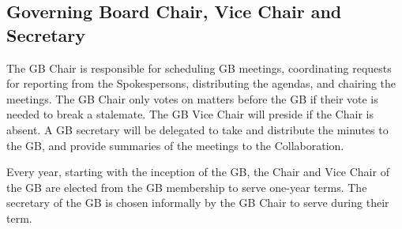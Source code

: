 \documentclass[12pt]{article}
\newcommand{\Comment}[1]{\textcolor{Blue}{(Comment: #1)}}
\begin{document}



\subsection{Governing Board Chair, Vice Chair and Secretary}

The GB Chair is responsible for scheduling GB meetings, coordinating requests for reporting from the Spokespersons, distributing the agendas, and chairing the meetings.  The GB Chair only votes on matters before the GB if their vote is needed to break a stalemate.  The GB Vice Chair will preside if the Chair is absent. A GB secretary will be delegated to take and distribute the minutes to the GB, and provide summaries of the meetings to the Collaboration.   

Every year, starting with the inception of the GB, the Chair and Vice Chair of the GB are elected from the GB membership to serve one-year terms. 
The secretary of the GB is chosen informally by the GB Chair to serve during their term. %
\end{document}

